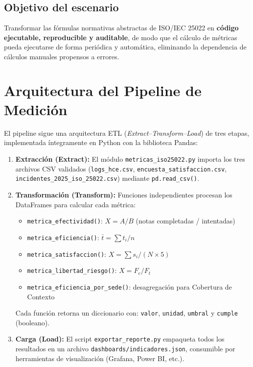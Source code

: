 \documentclass[12pt,a4paper]{article}
\begin{document}
\subsection{Objetivo del escenario}
Transformar las f\'ormulas normativas abstractas de ISO/IEC 25022 en \textbf{c\'odigo ejecutable, reproducible y auditable}, de modo que el c\'alculo de m\'etricas pueda ejecutarse de forma peri\'odica y autom\'atica, eliminando la dependencia de c\'alculos manuales propensos a errores.

\section{Arquitectura del Pipeline de Medici\'on}

El pipeline sigue una arquitectura ETL (\textit{Extract--Transform--Load}) de tres etapas, implementada \'integramente en Python con la biblioteca Pandas:

\begin{enumerate}
    \item \textbf{Extracci\'on (Extract):} El m\'odulo \texttt{metricas\_iso25022.py} importa los tres archivos CSV validados (\texttt{logs\_hce.csv}, \texttt{encuesta\_satisfaccion.csv}, \texttt{incidentes\_2025\_iso\_25022.csv}) mediante \texttt{pd.read\_csv()}.

    \item \textbf{Transformaci\'on (Transform):} Funciones independientes procesan los DataFrames para calcular cada m\'etrica:
    \begin{itemize}
        \item \texttt{metrica\_efectividad()}: $X = A/B$ (notas completadas / intentadas)
        \item \texttt{metrica\_eficiencia()}: $\bar{t} = \sum t_i / n$
        \item \texttt{metrica\_satisfaccion()}: $X = \sum s_i / (N \times 5)$
        \item \texttt{metrica\_libertad\_riesgo()}: $X = F_e / F_t$
        \item \texttt{metrica\_eficiencia\_por\_sede()}: desagregaci\'on para Cobertura de Contexto
    \end{itemize}
    Cada funci\'on retorna un diccionario con: \texttt{valor}, \texttt{unidad}, \texttt{umbral} y \texttt{cumple} (booleano).

    \item \textbf{Carga (Load):} El script \texttt{exportar\_reporte.py} empaqueta todos los resultados en un archivo \texttt{dashboards/indicadores.json}, consumible por herramientas de visualizaci\'on (Grafana, Power BI, etc.).
\end{enumerate}
\end{document}
